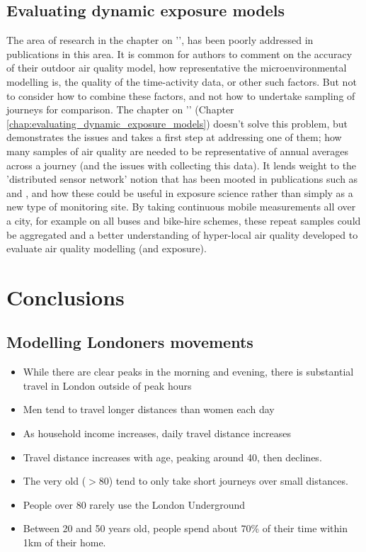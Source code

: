 \subsection{Evaluating dynamic exposure models}
\label{evaluation_wrapup}

The area of research in the chapter on '', has been poorly addressed in publications in this area. It is common for authors to comment on the accuracy of their outdoor air quality model, how representative the microenvironmental modelling is, the quality of the time-activity data, or other such factors. But not to consider how to combine these factors, and not how to undertake sampling of journeys for comparison. The chapter on '' (Chapter \ref{chap:evaluating_dynamic_exposure_models}) doesn't solve this problem, but demonstrates the issues and takes a first step at addressing one of them; how many samples of air quality are needed to be representative of annual averages across a journey (and the issues with collecting this data). It lends weight to the 'distributed sensor network' notion that has been mooted in publications such as \cite{Moltchanov2015} and \cite{Broday2017}, and how these could be useful in exposure science rather than simply as a new type of monitoring site. By taking continuous mobile measurements all over a city, for example on all buses and bike-hire schemes, these repeat samples could be aggregated and a better understanding of hyper-local air quality developed to evaluate air quality modelling (and exposure).

\newpage
\section{Conclusions}
\label{sec:wrap_up_conclusions}

\subsection{Modelling Londoners movements}
\label{subsec:wrapup_conc_ltds}

\begin{itemize}
    \item While there are clear peaks in the morning and evening, there is substantial travel in London outside of peak hours
    \item Men tend to travel longer distances than women each day
    \item As household income increases, daily travel distance increases
    \item Travel distance increases with age, peaking around 40, then declines.
    \item The very old ($>$80) tend to only take short journeys over small distances.
    \item People over 80 rarely use the London Underground
    \item Between 20 and 50 years old, people spend about 70\% of their time within 1km of their home.
\end{itemize}

